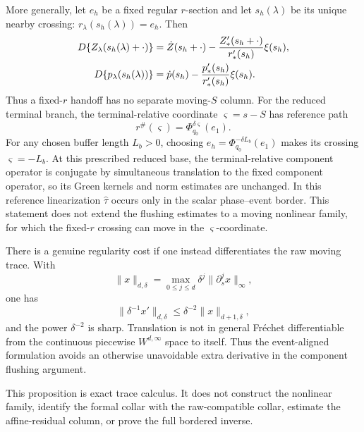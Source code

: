\begin{proposition}
More generally, let \(e_h\) be a fixed regular \(r\)-section and let
\(s_h(\lambda)\) be its unique nearby crossing:
\(r_\lambda(s_h(\lambda))=e_h\).  Then
\begin{align}
 D\{Z_\lambda(s_h(\lambda)+\cdot)\}
 &=\dot Z(s_h+\cdot)
   -\frac{Z_*'(s_h+\cdot)}{r_*'(s_h)}\xi(s_h),\notag\\
 D\{p_\lambda(s_h(\lambda))\}
 &=\dot p(s_h)
   -\frac{p_*'(s_h)}{r_*'(s_h)}\xi(s_h).          \label{eq:fixed-r-handoff-traces}
\end{align}
Thus a fixed-\(r\) handoff has no separate moving-\(S\) column.  For the
reduced terminal branch, the terminal-relative coordinate
\(\varsigma=s-S\) has reference path
\begin{equation}
 r^\#(\varsigma)=\Phi_{q_0}^{\delta\varsigma}(e_1).             \label{eq:terminal-relative-reduced-path}
\end{equation}
For any chosen buffer length \(L_b>0\), choosing
\(e_h=\Phi_{q_0}^{-\delta L_b}(e_1)\) makes its crossing
\(\varsigma=-L_b\).  At this prescribed reduced base, the
terminal-relative component operator is conjugate by simultaneous
translation to the fixed component operator, so its Green kernels and norm
estimates are unchanged.  In this reference linearization
\(\widehat\tau\) occurs only in the scalar phase--event border.  This
statement does not extend the flushing estimates to a moving nonlinear
family, for which the fixed-\(r\) crossing can move in the
\(\varsigma\)-coordinate.

There is a genuine regularity cost if one instead differentiates the raw
moving trace.  With
\begin{equation}
 \|x\|_{d,\delta}
 =\max_{0\le j\le d}\delta^j
       \|\partial_s^jx\|_\infty,                  \label{eq:moving-trace-strong-norm}
\end{equation}
one has
\begin{equation}
 \|\delta^{-1}x'\|_{d,\delta}
 \le\delta^{-2}\|x\|_{d+1,\delta},                \label{eq:moving-trace-one-order-loss}
\end{equation}
and the power \(\delta^{-2}\) is sharp.  Translation is not in general
Fr\'echet differentiable from the continuous piecewise
\(W^{d,\infty}\) space to itself.  Thus the event-aligned formulation
avoids an otherwise unavoidable extra derivative in the component
flushing argument.

This proposition is exact trace calculus.  It does not construct the
nonlinear family, identify the formal collar with the raw-compatible
collar, estimate the affine-residual column, or prove the full bordered
inverse.
\end{proposition}

